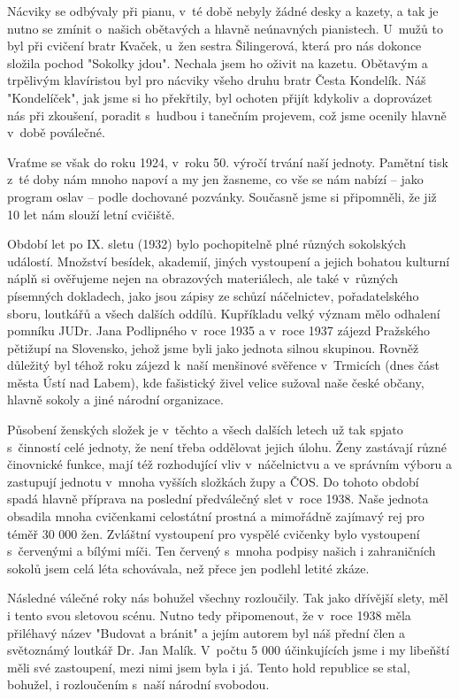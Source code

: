 \documentclass[a5paper, 11pt, twoside]{article}
\begin{document}
Nácviky se odbývaly při pianu, v~té době nebyly žádné desky a kazety, a
tak je nutno se zmínit o~našich obětavých a hlavně neúnavných
pianistech. U~mužů to byl při cvičení bratr Kvaček, u~žen sestra
Šilingerová, která pro nás dokonce složila pochod "Sokolky jdou".
Nechala jsem ho oživit na kazetu. Obětavým a trpělivým klavíristou byl
pro nácviky všeho druhu bratr Česta Kondelík. Náš "Kondelíček", jak
jsme si ho překřtily, byl ochoten přijít kdykoliv a doprovázet nás při
zkoušení, poradit s~hudbou i tanečním projevem, což jsme ocenily hlavně
v~době poválečné.

Vraťme se však do roku 1924, v~roku 50. výročí trvání naší jednoty.
Pamětní tisk z~té doby nám mnoho napoví a my jen žasneme, co vše se nám
nabízí -- jako program oslav -- podle dochované pozvánky. Současně jsme
si připomněli, že již 10 let nám slouží letní cvičiště.

Období let po IX. sletu (1932) bylo pochopitelně plné různých sokolských
událostí. Množství besídek, akademií, jiných vystoupení a jejich bohatou
kulturní náplň si ověřujeme nejen na obrazových materiálech, ale také
v~různých písemných dokladech, jako jsou zápisy ze schůzí náčelnictev,
pořadatelského sboru, loutkářů a všech dalších oddílů. Kupříkladu velký
význam mělo odhalení pomníku JUDr. Jana Podlipného v~roce 1935 a v~roce
1937 zájezd Pražského pětižupí na Slovensko, jehož jsme byli jako
jednota silnou skupinou. Rovněž důležitý byl téhož roku zájezd k~naší
menšinové svěřence v~Trmicích (dnes část města Ústí nad Labem), kde
fašistický živel velice sužoval naše české občany, hlavně sokoly a jiné
národní organizace.

Působení ženských složek je v~těchto a všech dalších letech už tak
spjato s~činností celé jednoty, že není třeba oddělovat jejich úlohu.
Ženy zastávají různé činovnické funkce, mají též rozhodující vliv
v~náčelnictvu a ve správním výboru a zastupují jednotu v~mnoha vyšších
složkách župy a ČOS. Do tohoto období spadá hlavně příprava na poslední
předválečný slet v~roce 1938. Naše jednota obsadila mnoha cvičenkami
celostátní prostná a mimořádně zajímavý rej pro téměř 30 000 žen.
Zvláštní vystoupení pro vyspělé cvičenky bylo vystoupení s~červenými a
bílými míči. Ten červený s~mnoha podpisy našich i zahraničních sokolů
jsem celá léta schovávala, než přece jen podlehl letité zkáze.

Následné válečné roky nás bohužel všechny rozloučily. Tak jako dřívější
slety, měl i tento svou sletovou scénu. Nutno tedy připomenout, že
v~roce 1938 měla přiléhavý název "Budovat a bránit" a jejím autorem byl
náš přední člen a světoznámý loutkář Dr. Jan Malík. V~počtu 5 000
účinkujících jsme i my libeňští měli své zastoupení, mezi nimi jsem byla
i já. Tento hold republice se stal, bohužel, i rozloučením s~naší
národní svobodou.
\end{document}
